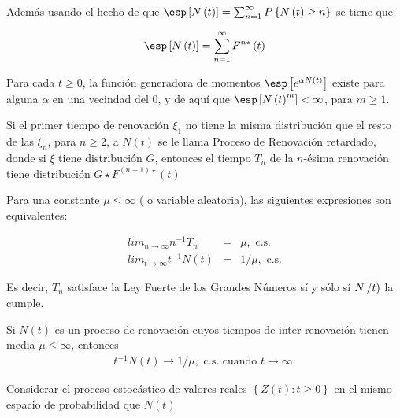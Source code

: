 Adem\'as usando el hecho de que $\esp\left[N\left(t\right)\right]=\sum_{n=1}^{\infty}P\left\{N\left(t\right)\geq n\right\}$
se tiene que

\begin{eqnarray*}
\esp\left[N\left(t\right)\right]=\sum_{n=1}^{\infty}F^{n\star}\left(t\right)
\end{eqnarray*}

\begin{Prop}
Para cada $t\geq0$, la funci\'on generadora de momentos $\esp\left[e^{\alpha N\left(t\right)}\right]$ existe para alguna $\alpha$ en una vecindad del 0, y de aqu\'i que $\esp\left[N\left(t\right)^{m}\right]<\infty$, para $m\geq1$.
\end{Prop}


\begin{Note}
Si el primer tiempo de renovaci\'on $\xi_{1}$ no tiene la misma distribuci\'on que el resto de las $\xi_{n}$, para $n\geq2$, a $N\left(t\right)$ se le llama Proceso de Renovaci\'on retardado, donde si $\xi$ tiene distribuci\'on $G$, entonces el tiempo $T_{n}$ de la $n$-\'esima renovaci\'on tiene distribuci\'on $G\star F^{\left(n-1\right)\star}\left(t\right)$
\end{Note}


\begin{Teo}
Para una constante $\mu\leq\infty$ ( o variable aleatoria), las siguientes expresiones son equivalentes:

\begin{eqnarray}
lim_{n\rightarrow\infty}n^{-1}T_{n}&=&\mu,\textrm{ c.s.}\\
lim_{t\rightarrow\infty}t^{-1}N\left(t\right)&=&1/\mu,\textrm{ c.s.}
\end{eqnarray}
\end{Teo}


Es decir, $T_{n}$ satisface la Ley Fuerte de los Grandes N\'umeros s\'i y s\'olo s\'i $N\left/t\right)$ la cumple.


\begin{Coro}
Si $N\left(t\right)$ es un proceso de renovaci\'on cuyos tiempos de inter-renovaci\'on tienen media $\mu\leq\infty$, entonces
\begin{eqnarray}
t^{-1}N\left(t\right)\rightarrow 1/\mu,\textrm{ c.s. cuando }t\rightarrow\infty.
\end{eqnarray}

\end{Coro}


Considerar el proceso estoc\'astico de valores reales $\left\{Z\left(t\right):t\geq0\right\}$ en el mismo espacio de probabilidad que $N\left(t\right)$

